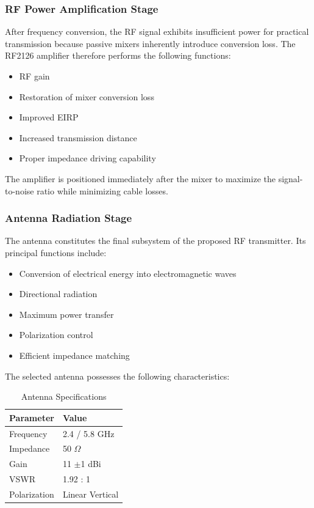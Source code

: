 \documentclass[12pt,a4paper]{report}
\begin{document}
	\subsubsection{RF Power Amplification Stage}
	
	After frequency conversion, the RF signal exhibits insufficient power for practical transmission because passive mixers inherently introduce conversion loss. The RF2126 amplifier therefore performs the following functions:
	\begin{itemize}
		\item RF gain
		\item Restoration of mixer conversion loss
		\item Improved EIRP
		\item Increased transmission distance
		\item Proper impedance driving capability
	\end{itemize}
	
	The amplifier is positioned immediately after the mixer to maximize the signal-to-noise ratio while minimizing cable losses.
	
	\subsubsection{Antenna Radiation Stage}
	
	The antenna constitutes the final subsystem of the proposed RF transmitter. Its principal functions include:
	\begin{itemize}
		\item Conversion of electrical energy into electromagnetic waves
		\item Directional radiation
		\item Maximum power transfer
		\item Polarization control
		\item Efficient impedance matching
	\end{itemize}
	
	The selected antenna possesses the following characteristics:
	
	\begin{table}[htbp]
		\centering
		\begin{tabular}{p{4cm} p{5cm}}
			\toprule
			\textbf{Parameter} & \textbf{Value} \\
			\midrule
			Frequency & 2.4 / 5.8 GHz \\
			Impedance & 50 $\Omega$ \\
			Gain & 11 $\pm$1 dBi \\
			VSWR & 1.92 : 1 \\
			Polarization & Linear Vertical \\
			\bottomrule
		\end{tabular}
		\caption{Antenna Specifications}
		\label{tab:antenna}
	\end{table}
	
\end{document}
